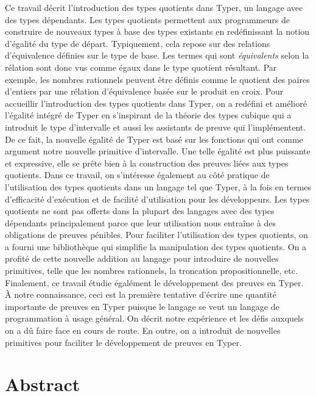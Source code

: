 \documentclass[12pt,twoside,maitrise]{dms}
\theoremstyle{definition}
\numberwithin{equation}{section}
\numberwithin{table}{chapter}
\numberwithin{figure}{chapter}
\begin{document}
Ce travail décrit l'introduction des types quotients dans
Typer\cite{monnier2019typer}, un langage avec des types dépendants. Les types
quotients permettent aux programmeurs de construire de nouveaux types à base des
types existants en redéfinissant la notion d'égalité du type de départ.
Typiquement, cela repose sur des relations d'équivalence définies sur le type de
base. Les termes qui sont \emph{équivalents} selon la rélation sont donc vus
comme égaux dans le type quotient résultant. Par exemple, les nombres rationnels
peuvent être définis comme le quotient des paires d'entiers par une rélation
d'équivalence basée sur le produit en croix. Pour accueillir l'introduction des
types quotients dans Typer, on a redéfini et amélioré l'égalité intégré de Typer
en s'inspirant de la théorie des types cubique qui a introduit le type
d'intervalle et aussi les assistants de preuve qui l'implémentent. De ce fait,
la nouvelle égalité de Typer est basé sur les fonctions qui ont comme argument
notre nouvelle primitive d'intervalle. Une telle égalité est plus puissante et
expressive, elle se prête bien à la construction des preuves liées aux types
quotients. Dans ce travail, on s'intéresse également au côté pratique de
l'utilisation des types quotients dans un langage tel que Typer, à la fois en
termes d'efficacité d'exécution et de facilité d'utilisation pour les
développeurs. Les types quotients ne sont pas offerts dans la plupart des
langages avec des types dépendants principalement parce que leur utilisation
nous entraîne à des obligations de preuves pénibles. Pour faciliter
l'utilisation des types quotients, on a fourni une bibliothèque qui simplifie la
manipulation des types quotients. On a profité de cette nouvelle addition au
langage pour introduire de nouvelles primitives, telle que les nombres
rationnels, la troncation propositionnelle, etc. Finalement, ce travail étudie
égalément le développement des preuves en Typer. À notre connaissance, ceci est
la première tentative d'écrire une quantité importante de preuves en Typer
puisque le langage se veut un langage de programmation à usage général. On
décrit notre expérience et les défis auxquels on a dû faire face en cours de
route. En outre, on a introduit de nouvelles primitives pour faciliter le
développement de preuves en Typer.


\anglais
\chapter*{Abstract}
\end{document}
